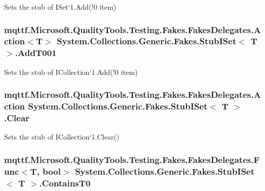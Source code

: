 Sets the stub of I\-Set`1.Add(!0 item)

\hypertarget{class_system_1_1_collections_1_1_generic_1_1_fakes_1_1_stub_i_set_3_01_t_01_4_ab52f869cd1021cca54d6620e049ba972}{
\subsubsection[{Add\-T001}]{\setlength{\rightskip}{0pt plus 5cm}mqttf.\-Microsoft.\-Quality\-Tools.\-Testing.\-Fakes.\-Fakes\-Delegates.\-Action$<$T$>$ System.\-Collections.\-Generic.\-Fakes.\-Stub\-I\-Set$<$ T $>$.Add\-T001}}\label{class_system_1_1_collections_1_1_generic_1_1_fakes_1_1_stub_i_set_3_01_t_01_4_ab52f869cd1021cca54d6620e049ba972}


Sets the stub of I\-Collection`1.Add(!0 item)

\hypertarget{class_system_1_1_collections_1_1_generic_1_1_fakes_1_1_stub_i_set_3_01_t_01_4_a1ea7e98aa37ac9ace87c5d1caeb34ade}{
\subsubsection[{Clear}]{\setlength{\rightskip}{0pt plus 5cm}mqttf.\-Microsoft.\-Quality\-Tools.\-Testing.\-Fakes.\-Fakes\-Delegates.\-Action System.\-Collections.\-Generic.\-Fakes.\-Stub\-I\-Set$<$ T $>$.Clear}}\label{class_system_1_1_collections_1_1_generic_1_1_fakes_1_1_stub_i_set_3_01_t_01_4_a1ea7e98aa37ac9ace87c5d1caeb34ade}


Sets the stub of I\-Collection`1.Clear()

\hypertarget{class_system_1_1_collections_1_1_generic_1_1_fakes_1_1_stub_i_set_3_01_t_01_4_a0e3a8d125585affa24271d7e10eccd99}{
\subsubsection[{Contains\-T0}]{\setlength{\rightskip}{0pt plus 5cm}mqttf.\-Microsoft.\-Quality\-Tools.\-Testing.\-Fakes.\-Fakes\-Delegates.\-Func$<$T, bool$>$ System.\-Collections.\-Generic.\-Fakes.\-Stub\-I\-Set$<$ T $>$.Contains\-T0}}\label{class_system_1_1_collections_1_1_generic_1_1_fakes_1_1_stub_i_set_3_01_t_01_4_a0e3a8d125585affa24271d7e10eccd99}


